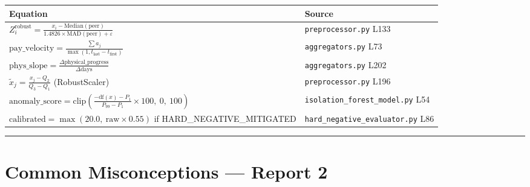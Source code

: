 \documentclass[11pt,a4paper]{article}
\begin{document}
\begin{table}[htbp]
\centering
\small
\begin{tabularx}{\textwidth}{l Y}
\toprule
\textbf{Equation} & \textbf{Source} \\
\midrule
$Z_i^\text{robust} = \frac{x_i - \text{Median}(\text{peer})}{1.4826 \times \text{MAD}(\text{peer}) + \varepsilon}$ & \texttt{preprocessor.py} L133 \\
$\text{pay\_velocity} = \frac{\sum a_j}{\max(1, t_\text{last} - t_\text{first})}$ & \texttt{aggregators.py} L73 \\
$\text{phys\_slope} = \frac{\Delta\text{physical\_progress}}{\Delta\text{days}}$ & \texttt{aggregators.py} L202 \\
$\tilde{x}_j = \frac{x_j - Q_2}{Q_3 - Q_1}$ (RobustScaler) & \texttt{preprocessor.py} L196 \\
$\text{anomaly\_score} = \text{clip}\!\left(\frac{-\text{df}(x) - P_1}{P_{99}-P_1} \times 100,\ 0,\ 100\right)$ & \texttt{isolation\_forest\_model.py} L54 \\
$\text{calibrated} = \max(20.0,\ \text{raw} \times 0.55)$ if HARD\_NEGATIVE\_MITIGATED & \texttt{hard\_negative\_evaluator.py} L86 \\
\bottomrule
\end{tabularx}
\end{table}


\vspace{1em}\hrule\vspace{1em}

\section{Common Misconceptions --- Report 2}
\end{document}
